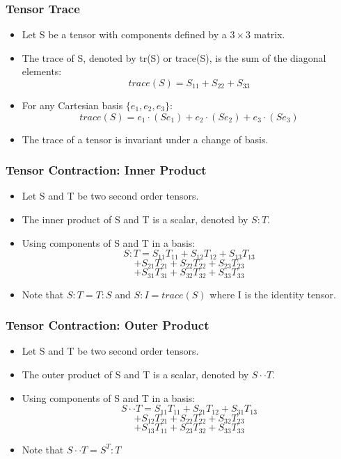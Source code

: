 \documentclass{beamer}
\begin{document}
\begin{frame}
\frametitle{Tensor Trace}
\begin{itemize}
    \item Let S be a tensor with components defined by a \(3 \times 3\) matrix. 
    \item The trace of S, denoted by tr(S) or trace(S), is the sum of the diagonal elements: 
    \[
    trace(S) = S_{11} + S_{22} + S_{33}
    \]
    \item For any Cartesian basis \(\{e_1, e_2, e_3\}\):
    \[
    trace(S) = e_1 \cdot (S e_1) + e_2 \cdot (S e_2) + e_3 \cdot (S e_3)
    \]
    \item The trace of a tensor is invariant under a change of basis. 
\end{itemize}
\end{frame}

\begin{frame}
\frametitle{Tensor Contraction: Inner Product}
\begin{itemize}
    \item Let S and T be two second order tensors. 
    \item The inner product of S and T is a scalar, denoted by \(S : T\). 
    \item Using components of S and T in a basis: 
    \[
    S : T = S_{11}T_{11} + S_{12}T_{12} + S_{13}T_{13}
    \]
    \[
    + S_{21}T_{21} + S_{22}T_{22} + S_{23}T_{23}
    \]
    \[
    + S_{31}T_{31} + S_{32}T_{32} + S_{33}T_{33}
    \]
    \item Note that \(S : T = T : S\) and \(S : I = trace(S)\) where I is the identity tensor. 
\end{itemize}
\end{frame}

\begin{frame}
\frametitle{Tensor Contraction: Outer Product}
\begin{itemize}
    \item Let S and T be two second order tensors. 
    \item The outer product of S and T is a scalar, denoted by \(S \cdot \cdot T\). 
    \item Using components of S and T in a basis:
    \[
    S \cdot \cdot T = S_{11}T_{11} + S_{21}T_{12} + S_{31}T_{13}
    \]
    \[
    + S_{12}T_{21} + S_{22}T_{22} + S_{32}T_{23}
    \]
    \[
    + S_{13}T_{11} + S_{23}T_{32} + S_{33}T_{33}
    \]
    \item Note that \(S \cdot \cdot T = S^T : T\) 
\end{itemize}
\end{frame}
\end{document}
